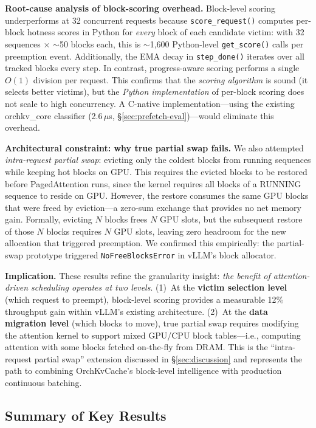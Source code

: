 \documentclass[conference]{IEEEtran}
\begin{document}
\textbf{Root-cause analysis of block-scoring overhead.} Block-level scoring underperforms at 32 concurrent requests because \texttt{score\_request()} computes per-block hotness scores in Python for \emph{every} block of each candidate victim: with 32 sequences $\times$ ${\sim}$50 blocks each, this is ${\sim}$1,600 Python-level \texttt{get\_score()} calls per preemption event. Additionally, the EMA decay in \texttt{step\_done()} iterates over all tracked blocks every step. In contrast, progress-aware scoring performs a single $O(1)$ division per request. This confirms that the \emph{scoring algorithm} is sound (it selects better victims), but the \emph{Python implementation} of per-block scoring does not scale to high concurrency. A C-native implementation---using the existing orchkv\_core classifier (2.6\,$\mu$s, \S\ref{sec:prefetch-eval})---would eliminate this overhead.

\textbf{Architectural constraint: why true partial swap fails.} We also attempted \emph{intra-request partial swap}: evicting only the coldest blocks from running sequences while keeping hot blocks on GPU. This requires the evicted blocks to be restored before PagedAttention runs, since the kernel requires all blocks of a RUNNING sequence to reside on GPU. However, the restore consumes the same GPU blocks that were freed by eviction---a zero-sum exchange that provides no net memory gain. Formally, evicting $N$ blocks frees $N$ GPU slots, but the subsequent restore of those $N$ blocks requires $N$ GPU slots, leaving zero headroom for the new allocation that triggered preemption. We confirmed this empirically: the partial-swap prototype triggered \texttt{NoFreeBlocksError} in vLLM's block allocator.

\textbf{Implication.} These results refine the granularity insight: \emph{the benefit of attention-driven scheduling operates at two levels}. (1)~At the \textbf{victim selection level} (which request to preempt), block-level scoring provides a measurable 12\% throughput gain within vLLM's existing architecture. (2)~At the \textbf{data migration level} (which blocks to move), true partial swap requires modifying the attention kernel to support mixed GPU/CPU block tables---i.e., computing attention with some blocks fetched on-the-fly from DRAM. This is the ``intra-request partial swap'' extension discussed in \S\ref{sec:discussion} and represents the path to combining OrchKvCache's block-level intelligence with production continuous batching.


\subsection{Summary of Key Results}
\end{document}
